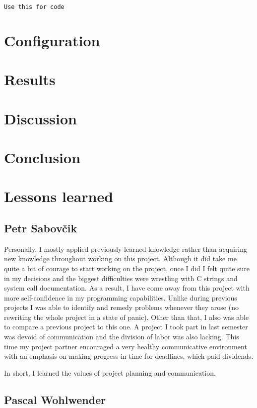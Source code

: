 \documentclass{article}
\begin{document}
\begin{lstlisting}[firstnumber=10]
Use this for code
\end{lstlisting}

\section{Configuration}

\section{Results}

\section{Discussion}

\section{Conclusion}

\section{Lessons learned}
\subsection{Petr Sabovčik}

Personally, I mostly applied previously learned knowledge rather than acquiring new knowledge throughout working on this project. Although it did take me quite a bit of courage to start working on the project, once I did I felt quite sure in my decisions and the biggest difficulties were wrestling with C strings and system call documentation. As a result, I have come away from this project with more self-confidence in my programming capabilities. Unlike during previous projects I was able to identify and remedy problems whenever they arose (no rewriting the whole project in a state of panic). Other than that, I also was able to compare a previous project to this one. A project I took part in last semester was devoid of communication and the division of labor was also lacking. This time my project partner encouraged a very healthy communicative environment with an emphasis on making progress in time for deadlines, which paid dividends.

In short, I learned the values of project planning and communication.


\subsection{Pascal Wohlwender}
\end{document}
